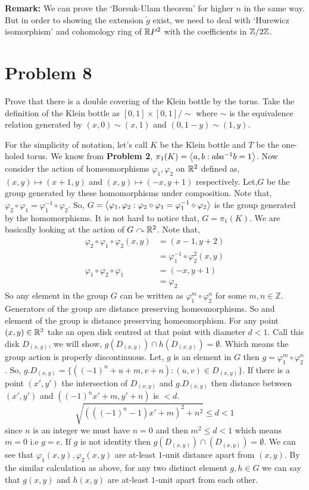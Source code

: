 \documentclass[11pt]{article}
\begin{document}
\noindent \textbf{\textsf{Remark:}} We can prove the `Borsuk-Ulam theorem' for higher $n$ in the same way. But in order to showing the extension $\tilde{g}$ exist, we need to deal with `Hurewicz isomorphism' and cohomology ring of $\mathbb{R} P^2$ with the coefficients in $\mathbb{Z}/2\mathbb{Z}$.


\section{Problem 8}

\begin{prob}{}{}
    Prove that there is a double covering of the Klein bottle by the torus. Take the definition of the Klein bottle as $[0,1] \times [0,1]/\sim$ where $\sim$ is the equivalence relation generated by $(x,0) \sim (x,1)$ and $(0,1-y) \sim (1,y)$.
\end{prob}

\sol For the simplicity of notation, let's call $K$ be the Klein bottle and $T$ be the one-holed torus. We know from \textbf{Problem 2}, $\pi_1(K) = \left\langle {a}, {b : aba^{-1}b = 1} \right\rangle$. Now consider the action of homeomorphisms $\varphi_1,\varphi_2$ on $\mathbb{R}^2$ defined as, $(x,y)\mapsto (x+1,y)$ and $(x,y)\mapsto (-x,y+1)$ respectively. Let,$G$ be the group generated by these homomorphisms under composition. Note that, $\varphi_2\circ \varphi_1 = \varphi_1^{-1} \circ \varphi_2$. So, $G = \left\langle {\varphi_1}, {\varphi_2 : \varphi_2\circ \varphi_1 = \varphi_1^{-1} \circ \varphi_2} \right\rangle$ is the group generated by the homomorphisms. It is not hard to notice that, $G = \pi_1(K)$. We are basically looking at the action of $G \curvearrowright \mathbb{R}^2$. Note that,
\begin{align*}
    \varphi_2 \circ \varphi_1 \circ \varphi_2 (x,y) &= (x-1,y+2)\\
    &= \varphi_1^{-1} \circ \varphi_2^2(x,y)\\
    \varphi_1 \circ \varphi_2 \circ \varphi_1 &= (-x,y+1) \\
    &= \varphi_2
\end{align*}
So any element in the group $G$ can be written as $\varphi_1^m \circ \varphi_2^n$ for some $m,n\in \mathbb{Z}$. Generators of the group are distance preserving homeomorphisms. So and element of the group is distance preserving homeomorphism. For any point $(x,y) \in \mathbb{R}^2$ take an open disk centred at that point with diameter $d< 1$. Call this disk $D_{(x,y)}$, we will show, $g(D_{(x,y)}) \cap h(D_{(x,y)}) = \emptyset$. Which means the group action is properly discontinuous. 
Let, $g$ is an element in $G$ then $g = \varphi_1^{m}\circ \varphi_2^{n}$. So, $g.D_{(x,y)} = \{((-1)^n +u+m,v+n) : (u,v) \in D_{(x,y)}\}$. If there is a point $(x',y')$ the intersection of $D_{(x,y)}$ and $g.D_{(x,y)}$ then distance between $(x',y')$ and $((-1)^nx'+m,y'+n)$ is $< d$. 
$$\sqrt{(((-1)^n-1)x'+m)^2+ n^2} \le d <1$$
since $n$ is an integer we must have $n =0$ and then $m^2 \le d<1$ which means $m=0$ i.e $g = e$. If $g$ is not identity then $g(D_{(x,y)}) \cap (D_{(x,y)}) = \emptyset$. We can see that $\varphi_1(x,y),\varphi_2(x,y)$ are at-least $1$-unit distance apart from $(x,y)$. By the similar calculation as above, for any two distinct element $g,h \in G$ we can say that $g(x,y)$ and $h(x,y)$ are at-least $1$-unit apart from each other.  
\end{document}
